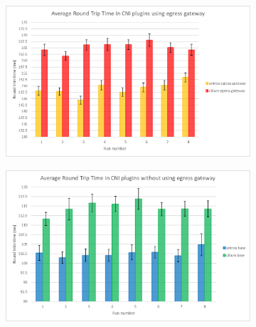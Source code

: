 \begin{figure}[H]
    \centering
    \begin{subfigure}[b]{0.45\textwidth}
        \includegraphics[width=\textwidth]{plots/small/rtt_egress.png}
        \caption{}
        \label{fig:rtt_a}
    \end{subfigure}
    \hfill
    \begin{subfigure}[b]{0.45\textwidth}
        \includegraphics[width=\textwidth]{plots/small/rtt_base.png}
        \caption{}
        \label{fig:rtt_b}
    \end{subfigure}
    
    \vspace{10pt}
    

\end{figure}
